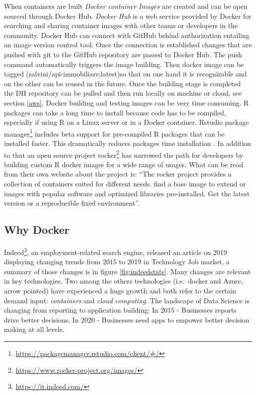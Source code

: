 \documentclass[
  12pt,
  a4paper,
  oneside]{book}
\DeclareRobustCommand{\href}[2]{#2\footnote{\url{#1}}}
\theoremstyle{definition}
\theoremstyle{definition}
\theoremstyle{definition}
\theoremstyle{remark}
\begin{document}
When containers are built \emph{Docker container Images} are created and can be open sourced through Docker Hub.
\emph{Docker Hub} is a web service provided by Docker for searching and sharing container images with other teams or developers in the community. Docker Hub can connect with GitHub behind authorization entailing an image version control tool. Once the connection is established changes that are pushed with git to the GitHub repository are passed to Docker Hub. The push command automatically triggers the image building. Then docker image can be tagged (salvini/api-immobiliare:latest)so that on one hand it is recognizable and on the other can be reused in the future. Once the building stage is completed the DH repository can be pulled and then run locally on machine or cloud, see section \ref{aws}.
Docker building and testing images can be very time consuming. R packages can take a long time to install because code has to be compiled, especially if using R on a Linux server or in a Docker container.
Rstudio \href{https://packagemanager.rstudio.com/client/\#/}{package manager} includes beta support for pre-compiled R packages that can be installed faster. This dramatically reduces packages time installation \citep{nolis_2020}.
In addition to that an open source project \href{https://www.rocker-project.org/images/}{rocker} has narrowed the path for developers by building custom R docker images for a wide range of usages. What can be read from their own website about the project is: ``The rocker project provides a collection of containers suited for different needs. find a base image to extend or images with popular software and optimized libraries pre-installed. Get the latest version or a reproducible fixed environment''.

\hypertarget{why-docker}{%
\subsection{Why Docker}\label{why-docker}}

\href{https://it.indeed.com/}{Indeed}, an employment-related search engine, released an article on 2019 displaying changing trends from 2015 to 2019 in Technology Job market, a summary of those changes is in figure \ref{fig:indeedstats}. Many changes are relevant in key technologies. Two among the others technologies (i.e.~docker and Azure, arrow pointed) have experienced a huge growth and both refer to the certain demand input: \emph{containers} and \emph{cloud computing}.
The landscape of Data Science is changing from reporting to application building:
In 2015 - Businesses reports drive better decisions.
In 2020 - Businesses need apps to empower better decision making at all levels.
\end{document}
